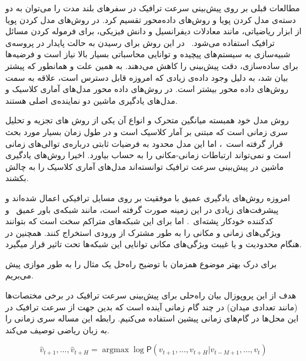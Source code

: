 \documentclass{article}
\begin{document}
مطالعات قبلی بر روی پیش‌بینی سرعت ترافیک در سفرهای بلند مدت را می‌توان به دو دسته‌ی مدل کردن پویا و روش‌های داده‌محور تقسیم کرد.
در روش‌های مدل کردن پویا از ابزار ریاضیاتی، مانند معادلات دیفرانسیل و دانش فیزیکی، برای فرموله کردن مسائل ترافیک استفاده می‌شود.~
در این روش برای رسیدن به حالت پایدار در پروسه‌ی شبیه‌سازی به سیستم‌های پیچیده و توانایی محاسباتی بسیار بالا نیاز است و فرضیه‌ها برای ساده‌سازی، دقت پیش‌بینی را کاهش می‌دهند.
به همین علت و همانطور که پیشتر بیان شد، به دلیل وجود داده‌ی زیادی که امروزه قابل دسترس است، علاقه به سمت روش‌های داده محور بیشتر است.
در روش‌های داده محور مدل‌های آماری کلاسیک و مدل‌های یادگیری ماشین دو نماینده‌ی اصلی هستند.

روش مدل خود همبسته میانگین متحرک و انواع آن یکی از روش های تجزیه و تحلیل سری زمانی است که مبتنی بر آمار کلاسیک است
و در طول زمان بسیار مورد بحث قرار گرفته است~،
اما این مدل محدود به فرضیات ثابتی درباره‌ی توالی‌های زمانی است و نمی‌تواند ارتباطات زمانی-مکانی را به حساب بیاورد.
اخیرا روش‌های یادگیری ماشین در پیش‌بینی سرعت ترافیک توانسته‌اند مدل‌های آماری کلاسیک را به چالش بکشند.

امروزه روش‌های یادگیری عمیق با موفقیت بر روی مسايل ترافیکی اعمال شده‌اند و پیشرفت‌های زیادی در این زمینه صورت گرفته است،
مانند شبکه‌ی باور عمیق~ و کدکننده خودکار پشته‌ای~.
اما برای این شبکه‌های متراکم سخت است که بتوانند ویژگی‌های زمانی و مکانی را به طور مشترک از ورودی استخراج کنند.
همچنین در هنگام محدودیت و یا غیبت ویژگی‌های مکانی توانایی این شبکه‌ها تحت تاثیر قرار میگیرد.


برای درک بهتر موضوع همزمان با توضیح راه‌حل یک مثال را به طور موازی پیش می‌بریم.

هدف از این پروپوزال بیان راه‌حلی برای پیش‌بینی سرعت ترافیک در برخی مختصات‌ها (مانند تعدادی میدان) در چند گام زمانی آینده است که
بدین جهت از سرعت ترافیک در این محل‌ها در گام‌های زمانی پیشین استفاده می‌کنیم. رابطه  این مساله سری زمانی را به زبان ریاضی توصیف می‌کند.

\begin{equation}
  \label{eq:base}
  \hat{v}_{t+1}, \ldots,  \hat{v}_{t+H} = \mathop{\mathrm{argmax}} \log \mathsf{P}({v}_{t+1}, \ldots,  v_{t+H} | v_{t-M+1} , \ldots,  v_{t})
\end{equation}
\end{document}
